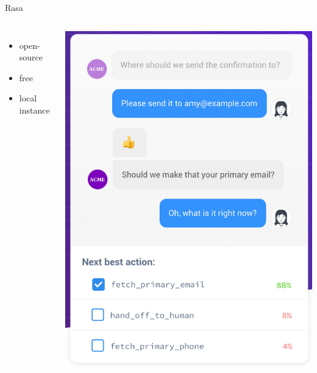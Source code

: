 \documentclass[pdf]{beamer}
\begin{document}
    \begin{frame}{Rasa}
        \begin{columns}
            \begin{itemize}
                \item open-source
                \item free
                \item local instance
            \end{itemize}
            \begin{center}
                \includegraphics[height=0.9\textheight]{figures/rasa.png}
            \end{center}
        \end{columns}
    \end{frame}
\end{document}
